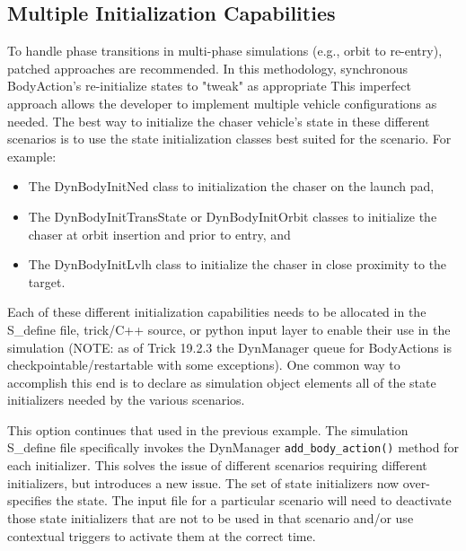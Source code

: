 \subsection*{Multiple Initialization Capabilities}
To handle phase transitions in multi-phase simulations (e.g., orbit to re-entry), patched approaches are recommended.
In this methodology, synchronous BodyAction's re-initialize states to "tweak" as appropriate
This imperfect approach allows the developer to implement multiple vehicle configurations as needed.
The best way to initialize the chaser vehicle's state in these different
scenarios is to use the \ModelDesc state initialization classes best suited
for the scenario. For example:
\begin{itemize}
\item The DynBodyInitNed class to initialization the chaser on the launch pad,
\item The DynBodyInitTransState or DynBodyInitOrbit classes to initialize
the chaser at orbit insertion and prior to entry, and
\item The DynBodyInitLvlh class to initialize the chaser in close proximity
to the target.
\end{itemize}
Each of these different initialization capabilities needs to be allocated
in the S\_define file, trick/C++ source, or python input layer to enable their use in the simulation
(NOTE: as of Trick 19.2.3 the DynManager queue for BodyActions is checkpointable/restartable with some exceptions).
One common way to accomplish this end is to declare as simulation object
elements all of the state initializers needed by the various scenarios.

This option continues that used in the previous example.
The simulation S\_define file specifically
invokes the DynManager {\tt add\_body\_action()} method for
each initializer. This solves the issue of different scenarios
requiring different initializers, but introduces a new issue.
The set of state initializers now over-specifies the state.
The input file for a particular scenario will need to deactivate
those state initializers that are not to be used in that scenario
and/or use contextual triggers to activate them at the correct time.

